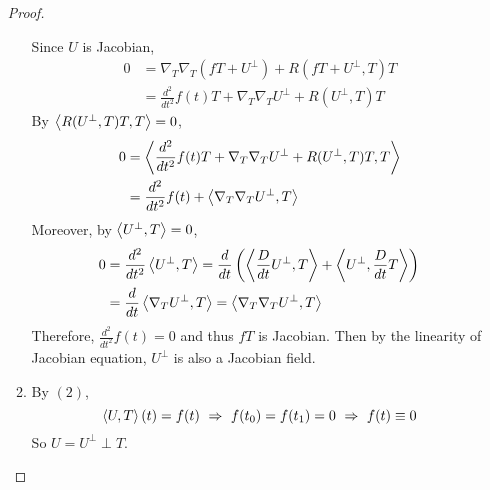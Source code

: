 \begin{enumerate}[label=\arabic{*}.]
\begin{proof}
\begin{enumerate}[label=(\arabic{*})]
			\noindent Since $U$ is Jacobian,
			\begin{equation*}
				\begin{aligned}
					0 &=  \nabla_T\nabla_T(fT+ U^\perp) + R(fT+ U^\perp,T)T \\
					&= \frac{d^2}{dt^2}f(t)T + \nabla_T\nabla_TU^\perp + R(U^\perp,T)T
				\end{aligned}
			\end{equation*}
			By $\left\langle R(U^\perp,T)T,T \right\rangle = 0$,
			\begin{equation*}
				\begin{aligned}
					0 &= \left\langle  \frac{d^2}{dt^2}f(t)T + \nabla_T\nabla_TU^\perp + R(U^\perp,T)T,T \right\rangle \\
					&= \frac{d^2}{dt^2}f(t) + \left\langle \nabla_T\nabla_TU^\perp,T \right\rangle
				\end{aligned}
			\end{equation*}
			Moreover, by $\left\langle U^\perp,T \right\rangle = 0$,
			\begin{equation*}
				\begin{aligned}
					0 &= \frac{d^2}{dt^2}\left\langle U^\perp,T \right\rangle = \frac{d}{dt}\left(\left\langle \frac{D}{dt}U^\perp,T \right\rangle+\left\langle U^\perp,\frac{D}{dt}T \right\rangle\right) \\
					&= \frac{d}{dt}\left\langle \nabla_TU^\perp,T \right\rangle = \left\langle \nabla_T\nabla_TU^\perp,T \right\rangle
				\end{aligned}
			\end{equation*}
			Therefore, $\frac{d^2}{dt^2}f(t) = 0$ and thus $fT$ is Jacobian. Then by the linearity of Jacobian equation, $U^\perp$ is also a Jacobian field.

			\item By $(2)$, 
			\begin{equation*}
				\left\langle U,T \right\rangle(t) = f(t)~\Rightarrow~f(t_0)=f(t_1) = 0 ~\Rightarrow~f(t)\equiv 0
			\end{equation*}
			So $U = U^\perp \perp T$. 
		\end{enumerate}
	\end{proof}


\end{enumerate}
